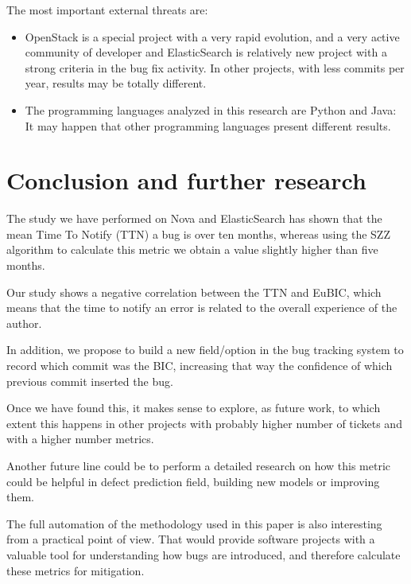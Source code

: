 \documentclass[10pt, conference]{IEEEtran}
\begin{document}
The most important external threats are:

\begin{itemize}
    \item OpenStack is a special project with a very rapid evolution, and a very active community of developer and ElasticSearch is relatively new project with a strong criteria in the bug fix activity. In other projects, with less commits per year, results may be totally different.
    \item The programming languages analyzed in this research are Python and Java: It may happen that other programming languages present different results.
\end{itemize}

\section{Conclusion and further research}
\label{sec:conclusions}

The study we have performed on Nova and ElasticSearch has shown that the mean Time To Notify (TTN) a bug is over ten months, whereas using the SZZ algorithm to calculate this metric we obtain a value slightly higher than five months.


Our study shows a negative correlation between the TTN and EuBIC, which means that the time to notify an error is related to the overall experience of the author.  

In addition, we propose to build a new field/option in the bug tracking system to record which commit was the BIC, increasing that way the confidence of which previous commit inserted the bug.

Once we have found this, it makes sense to explore, as future work, to which extent this happens in other projects with probably higher number of tickets and with a higher number metrics.

Another future line could be to perform a detailed research on how this metric could be helpful in defect prediction field, building new models or improving them. %

The full automation of the methodology used in this paper is also interesting from a practical point of view. That would provide software projects with a valuable tool for understanding how bugs are introduced, and therefore calculate these metrics for mitigation.
\end{document}
